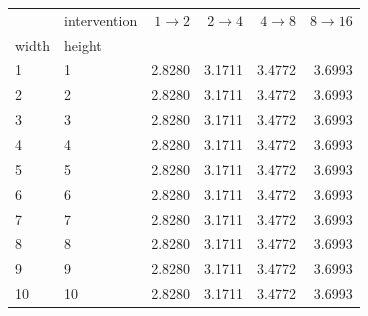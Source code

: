 \begin{tabular}{llrrrr}
\toprule
   & intervention &  $1 \to 2$ &  $2 \to 4$ &  $4 \to 8$ &  $8 \to 16$ \\
width & height &            &            &            &             \\
\midrule
1  & 1  &     2.8280 &     3.1711 &     3.4772 &      3.6993 \\
2  & 2  &     2.8280 &     3.1711 &     3.4772 &      3.6993 \\
3  & 3  &     2.8280 &     3.1711 &     3.4772 &      3.6993 \\
4  & 4  &     2.8280 &     3.1711 &     3.4772 &      3.6993 \\
5  & 5  &     2.8280 &     3.1711 &     3.4772 &      3.6993 \\
6  & 6  &     2.8280 &     3.1711 &     3.4772 &      3.6993 \\
7  & 7  &     2.8280 &     3.1711 &     3.4772 &      3.6993 \\
8  & 8  &     2.8280 &     3.1711 &     3.4772 &      3.6993 \\
9  & 9  &     2.8280 &     3.1711 &     3.4772 &      3.6993 \\
10 & 10 &     2.8280 &     3.1711 &     3.4772 &      3.6993 \\
\bottomrule
\end{tabular}
